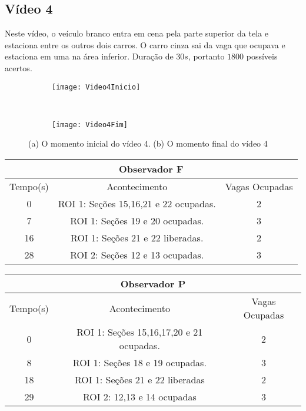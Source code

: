 \subsection{Vídeo 4}

Neste vídeo, o veículo branco entra em cena pela parte superior da tela e estaciona entre os outros dois carros. O carro cinza sai da vaga que ocupava e estaciona em uma na área inferior. Duração de $30s$, portanto $1800$ possíveis acertos.

\begin{figure}[!h]
\centering
\begin{subfigure}{.5\textwidth}
\centering
\texttt{[image: Video4Inicio]}
\caption{}
\end{subfigure}\
\begin{subfigure}{.5\textwidth}
\centering
\texttt{[image: Video4Fim]}
\caption{}
\end{subfigure}
\centering
\caption{(a) O momento inicial do vídeo 4. (b) O momento final do vídeo 4}%
\label{}%
\end{figure}

\begin{center}
\begin{tabular}{|c||c||c|}
\hline
\multicolumn{3}{|c|}{Observador F}  \\ \hline \hline
Tempo(s) & Acontecimento & Vagas Ocupadas\\ \hline
0 & ROI 1: Seções 15,16,21 e 22 ocupadas. & 2 \\ \hline
7 & ROI 1: Seções 19 e 20 ocupadas. & 3 \\ \hline
16 & ROI 1: Seções 21 e 22 liberadas. & 2 \\ \hline
28 & ROI 2: Seções 12 e 13 ocupadas. & 3 \\
\hline
\end{tabular}
\end{center}

\begin{center}
\begin{tabular}{|c||c||c|}
\hline
\multicolumn{3}{|c|}{Observador P}  \\ \hline \hline
Tempo(s) & Acontecimento & Vagas Ocupadas\\ \hline
0 & ROI 1: Seções 15,16,17,20 e 21 ocupadas. & 2 \\ \hline
8 & ROI 1: Seções 18 e 19 ocupadas. & 3 \\ \hline
18 & ROI 1: Seções 21 e 22 liberadas & 2 \\ \hline
29 & ROI 2: 12,13 e 14 ocupadas & 3 \\
\hline
\end{tabular}
\end{center}

